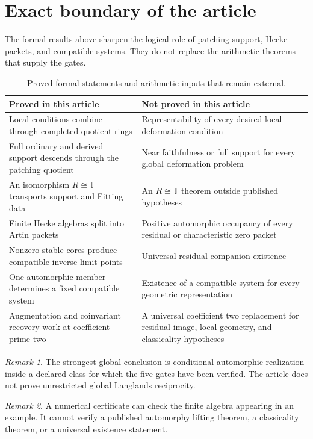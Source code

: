 \documentclass[11pt]{amsart}
\theoremstyle{definition}
\theoremstyle{remark}
\newtheorem{remark}[remark]{Remark}
\newcommand{\TT}{\mathbb T}
\begin{document}
\section{Exact boundary of the article}\label{sec:boundary}

The formal results above sharpen the logical role of patching support, Hecke packets, and compatible systems. They do not replace the arithmetic theorems that supply the gates.

\begin{table}[t]
\centering
\caption{Proved formal statements and arithmetic inputs that remain external.}
\label{tab:boundary}
\begin{tabular}{p{}p{}}
\toprule
Proved in this article & Not proved in this article\\
\midrule
Local conditions combine through completed quotient rings & Representability of every desired local deformation condition\\
Full ordinary and derived support descends through the patching quotient & Near faithfulness or full support for every global deformation problem\\
An isomorphism \(R\cong\TT\) transports support and Fitting data & An \(R\cong\TT\) theorem outside published hypotheses\\
Finite Hecke algebras split into Artin packets & Positive automorphic occupancy of every residual or characteristic zero packet\\
Nonzero stable cores produce compatible inverse limit points & Universal residual companion existence\\
One automorphic member determines a fixed compatible system & Existence of a compatible system for every geometric representation\\
Augmentation and coinvariant recovery work at coefficient prime two & A universal coefficient two replacement for residual image, local geometry, and classicality hypotheses\\
\bottomrule
\end{tabular}
\end{table}

\begin{remark}
The strongest global conclusion is conditional automorphic realization inside a declared class for which the five gates have been verified. The article does not prove unrestricted global Langlands reciprocity.
\end{remark}

\begin{remark}
A numerical certificate can check the finite algebra appearing in an example. It cannot verify a published automorphy lifting theorem, a classicality theorem, or a universal existence statement.
\end{remark}
\end{document}
